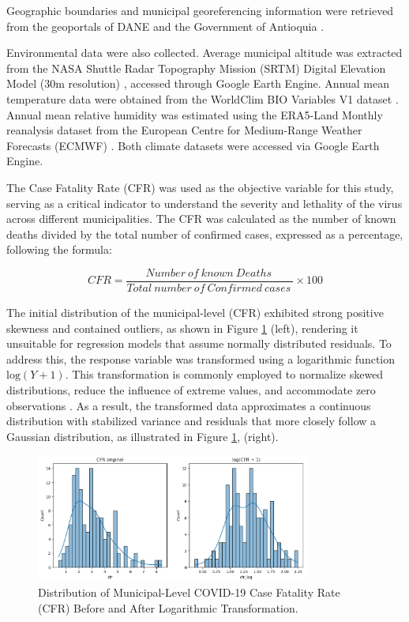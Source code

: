 \documentclass[a4paper,fleqn]{cas-sc}
\begin{document}
Geographic boundaries and municipal georeferencing information were retrieved from the geoportals of DANE \citep{DANE_co} and the Government of Antioquia \citep{ANT_co}.

Environmental data were also collected. Average municipal altitude was extracted from the NASA Shuttle Radar Topography Mission (SRTM) Digital Elevation Model (30m resolution) \citep{Farr2007}, accessed through Google Earth Engine. Annual mean temperature data were obtained from the WorldClim BIO Variables V1 dataset \citep{Hijmans2005}. Annual mean relative humidity was estimated using the ERA5-Land Monthly reanalysis dataset from the European Centre for Medium-Range Weather Forecasts (ECMWF) \citep{MunozSabater2019}. Both climate datasets were accessed via Google Earth Engine.

The Case Fatality Rate (CFR) \citep{Chaparro2021} was used as the objective variable for this study, serving as a critical indicator to understand the severity and lethality of the virus across different municipalities. The CFR was calculated as the number of known deaths divided by the total number of confirmed cases, expressed as a percentage, following the formula:

$$
\mathit{CFR} = \frac{\mathit{Number\ of\ known\ Deaths\ }}{\mathit{Total\ number\ of\ Confirmed\ cases\ }} \times 100
$$

The initial distribution of the municipal-level (CFR) exhibited strong positive skewness and contained outliers, as shown in Figure \ref{GAUSS-log} (left), rendering it unsuitable for regression models that assume normally distributed residuals. To address this, the response variable was transformed using a logarithmic function $\text{log}(Y + 1)$. This transformation is commonly employed to normalize skewed distributions, reduce the influence of extreme values, and accommodate zero observations \citep{Aristizabal2024}. As a result, the transformed data approximates a continuous distribution with stabilized variance and residuals that more closely follow a Gaussian distribution, as illustrated in Figure \ref{GAUSS-log}, (right).

\begin{figure}
  \centering
  \includegraphics[width=0.8\textwidth]{figures/figure03.png}
  \caption{Distribution of Municipal-Level COVID-19 Case Fatality Rate (CFR) Before and After Logarithmic Transformation.}\label{GAUSS-log}
\end{figure}
\end{document}
